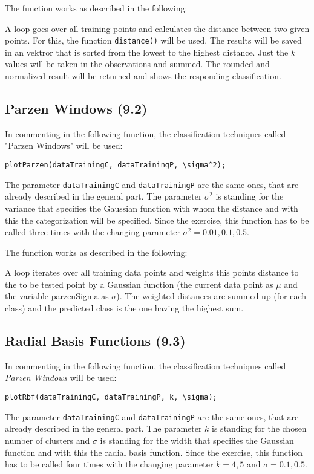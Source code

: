 \documentclass[a4paper,headings=small]{scrartcl}
\begin{document}
The function works as described in the following:

A loop goes over all training points and calculates the distance between two given points.
For this, the function \verb=distance()= will be used.
The results will be saved in an vektror that is sorted from the lowest to the highest distance.
Just the $k$ values will be taken in the observations and summed.
The rounded and normalized result will be returned and shows the responding classification.

\subsection{Parzen Windows (9.2)}
In commenting in the following function, the classification techniques called "Parzen Windows" will be used:

\begin{verbatim}
plotParzen(dataTrainingC, dataTrainingP, \sigma^2);
\end{verbatim}
The parameter \verb=dataTrainingC= and \verb=dataTrainingP= are the same ones,
that are already described in the general part.
The parameter $\sigma^2$ is standing for the variance that specifies the Gaussian function
with whom the distance and with this the categorization will be specified.
Since the exercise, this function has to be called three times with the changing parameter $\sigma^2 = 0.01, 0.1, 0.5$.

The function works as described in the following:

A loop iterates over all training data points and weights this points distance
to the to be tested point by a Gaussian function
(the current data point as $\mu$ and the variable parzenSigma as $\sigma$).
The weighted distances are summed up (for each class) and the predicted class is the one having the highest sum.

\subsection{Radial Basis Functions (9.3)}
In commenting in the following function, the classification techniques called \emph{Parzen Windows} will be used:

\begin{verbatim}
plotRbf(dataTrainingC, dataTrainingP, k, \sigma);
\end{verbatim}
The parameter \verb=dataTrainingC= and \verb=dataTrainingP= are the same ones, that are already described in the general part.
The parameter $k$ is standing for the chosen number of clusters and $\sigma$ is standing for the width that specifies
the Gaussian function and with this the radial basis function.
Since the exercise, this function has to be called four times with the changing parameter $k = 4, 5$ and $\sigma = 0.1, 0.5$.
\end{document}
